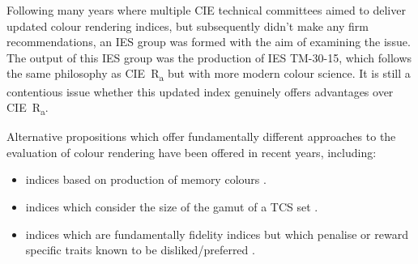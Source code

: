 Following many years where multiple \gls{CIE} technical committees aimed to deliver updated colour rendering indices, but subsequently didn't make any firm recommendations, an \gls{IES} group was formed with the aim of examining the issue. The output of this \gls{IES} group was the production of \gls{IES} TM-30-15\cite{ies_ies_2015}, which follows the same philosophy as \gls{CIE}~R\textsubscript{a} but with more modern colour science. It is still a contentious issue whether this updated index genuinely offers advantages over \gls{CIE}~R\textsubscript{a}. 

Alternative propositions which offer fundamentally different approaches to the evaluation of colour rendering have been offered in recent years, including: 
\begin{itemize}
\item indices based on production of memory colours \citep{smet_memory_2012}.
\item indices which consider the size of the gamut of a \gls{TCS} set \citep{rea_color_2008,teunissen_characterising_2016}.
\item indices which are fundamentally fidelity indices but which penalise or reward specific traits known to be disliked/preferred \citep{ohno_rationale_2010}.
\end{itemize}

